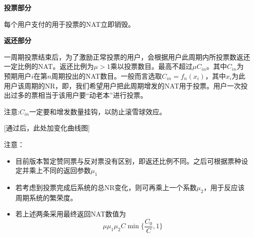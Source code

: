\textbf{投票部分}

每个用户支付的用于投票的NAT立即销毁。

\textbf{返还部分}

一周期投票结束后，为了激励正常投票的用户，会根据用户此周期内所投票数返还一定比例的NAT。返还比例为$\mu>1$乘以投票数目。最高不超过$\mu C_{in}$。其中$C_{in}$为预期用户$i$在第$n$周期投出的NAT数目。一般而言选取$C_{in}=f_n(x_i)$，其中$x_i$为此用户该周期的NR，即，我们希望用户把此周期增发的NAT用于投票。用户一次投出过多的票相当于该用户要“动老本”进行投票。

注意:$C_{in}$一定要和增发数量挂钩，以防止滚雪球效应。	

\begin{comment}
具体数额为
$$\mu C \min \{\frac{C_0}{C},1\}$$
其中$\mu>1$为激励系数，可选取$\mu=1.1$。$C$为用户此阶段（一个增发周期内）投票花费（即烧毁的）NAT总数目，$C_0$为预期希望用户投出的NAT数目，每个用户对应不同的$C_0$，一般而言选取$C_0=\lambda f(x_1)$，即我们希望用户把此阶段增发的NAT用于投票，而不推荐用户一次投出过多的票。

对于用户而言，假设他一个阶段内用$C$枚NAT进行投票且$C \leq C_0$，则其NAT的变化量为
$$\mu C \min \{\frac{C_0}{C},1\}-C = \mu C_0-C$$
上式随$C$递减。这意味着对于一个利益最大化的用户而言他的最优策略为投出$C_0$票。如若项目对其意义重大，需要投出大量NAT，则有可能$\mu C_0-C <0$，相当于该用户要“动老本”进行投票。

若$C < C_0$，则其NAT的变化量为

$$\mu C \min \{\frac{C_0}{C},1\}-C = (\mu-1)C$$
上式随$C$递增，这意味着最优策略同样是投出$C_0$票。当投票数目较少时仍能获得收益但相对投$C_0$而言较少。

\end{comment}
[通过后，此处加变化曲线图]

注意：
\begin{itemize}
\item 目前版本暂定赞同票与反对票没有区别，即返还比例不同。之后可根据票种设定并乘上不同的返回参数$\mu_1$
\item 若考虑到投票完成后系统的总NR变化，则可再乘上一个系数$\mu_2$，用于反应该周期系统的繁荣度。
\item 若上述两条采用最终返回NAT数值为
$$ \mu\mu_1\mu_2 C \min \{\frac{C_0}{C},1\}$$
\end{itemize}


